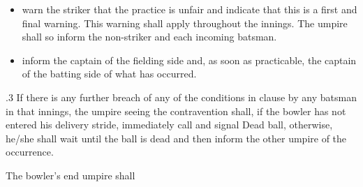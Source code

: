 \documentclass[12pt]{article}
\begin{document}
\vspace{\baselineskip}
\begin{itemize}
	\item {\fontsize{9pt}{10.8pt}\selectfont warn the striker that the practice is unfair and indicate that this is a first and final warning. This warning shall apply throughout the innings. The umpire shall so inform the non-striker and each incoming batsman.\par}\par


\vspace{\baselineskip}
	\item {\fontsize{9pt}{10.8pt}\selectfont inform the captain of the fielding side and, as soon as practicable, the captain of the batting side of what has occurred.\par}
\end{itemize}\par


\vspace{\baselineskip}
\begin{adjustwidth}{0.5in}{0.08in}
{\fontsize{9pt}{10.8pt}.3 If there is any further breach of any of the conditions in clause by any batsman in that innings, the umpire seeing the contravention shall, if the bowler has not entered his delivery stride, immediately call and signal Dead ball, otherwise, he/she shall wait until the ball is dead and then inform the other umpire of the occurrence.\par}\par

\end{adjustwidth}


\vspace{\baselineskip}
\begin{adjustwidth}{0.5in}{0.0in}
{\fontsize{9pt}{10.8pt}\selectfont The bowler’s end umpire shall\par}\par

\end{adjustwidth}
\end{document}
